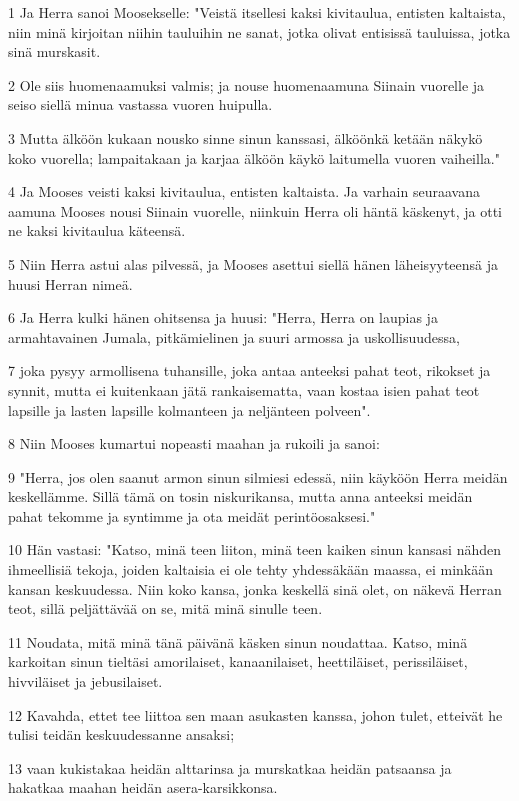 \par 1 Ja Herra sanoi Moosekselle: "Veistä itsellesi kaksi kivitaulua, entisten kaltaista, niin minä kirjoitan niihin tauluihin ne sanat, jotka olivat entisissä tauluissa, jotka sinä murskasit.
\par 2 Ole siis huomenaamuksi valmis; ja nouse huomenaamuna Siinain vuorelle ja seiso siellä minua vastassa vuoren huipulla.
\par 3 Mutta älköön kukaan nousko sinne sinun kanssasi, älköönkä ketään näkykö koko vuorella; lampaitakaan ja karjaa älköön käykö laitumella vuoren vaiheilla."
\par 4 Ja Mooses veisti kaksi kivitaulua, entisten kaltaista. Ja varhain seuraavana aamuna Mooses nousi Siinain vuorelle, niinkuin Herra oli häntä käskenyt, ja otti ne kaksi kivitaulua käteensä.
\par 5 Niin Herra astui alas pilvessä, ja Mooses asettui siellä hänen läheisyyteensä ja huusi Herran nimeä.
\par 6 Ja Herra kulki hänen ohitsensa ja huusi: "Herra, Herra on laupias ja armahtavainen Jumala, pitkämielinen ja suuri armossa ja uskollisuudessa,
\par 7 joka pysyy armollisena tuhansille, joka antaa anteeksi pahat teot, rikokset ja synnit, mutta ei kuitenkaan jätä rankaisematta, vaan kostaa isien pahat teot lapsille ja lasten lapsille kolmanteen ja neljänteen polveen".
\par 8 Niin Mooses kumartui nopeasti maahan ja rukoili ja sanoi:
\par 9 "Herra, jos olen saanut armon sinun silmiesi edessä, niin käyköön Herra meidän keskellämme. Sillä tämä on tosin niskurikansa, mutta anna anteeksi meidän pahat tekomme ja syntimme ja ota meidät perintöosaksesi."
\par 10 Hän vastasi: "Katso, minä teen liiton, minä teen kaiken sinun kansasi nähden ihmeellisiä tekoja, joiden kaltaisia ei ole tehty yhdessäkään maassa, ei minkään kansan keskuudessa. Niin koko kansa, jonka keskellä sinä olet, on näkevä Herran teot, sillä peljättävää on se, mitä minä sinulle teen.
\par 11 Noudata, mitä minä tänä päivänä käsken sinun noudattaa. Katso, minä karkoitan sinun tieltäsi amorilaiset, kanaanilaiset, heettiläiset, perissiläiset, hivviläiset ja jebusilaiset.
\par 12 Kavahda, ettet tee liittoa sen maan asukasten kanssa, johon tulet, etteivät he tulisi teidän keskuudessanne ansaksi;
\par 13 vaan kukistakaa heidän alttarinsa ja murskatkaa heidän patsaansa ja hakatkaa maahan heidän asera-karsikkonsa.
